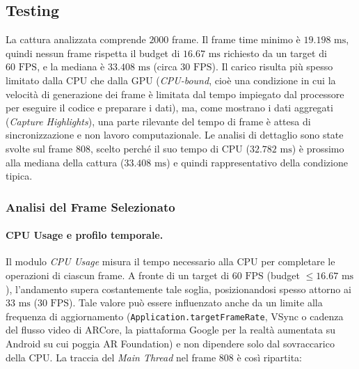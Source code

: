 \subsection{Testing}
La cattura analizzata comprende $2000$ frame. Il frame time minimo è $19.198\text{ ms}$, quindi nessun frame rispetta il budget di $16.67\text{ ms}$ richiesto da un target di $60\text{ FPS}$, e la mediana è $33.408\text{ ms}$ (circa $30\text{ FPS}$). Il carico risulta più spesso limitato dalla CPU che dalla GPU (\textit{CPU-bound}, cioè una condizione in cui la velocità di generazione dei frame è limitata dal tempo impiegato dal processore per eseguire il codice e preparare i dati), ma, come mostrano i dati aggregati (\textit{Capture Highlights}), una parte rilevante del tempo di frame è attesa di sincronizzazione e non lavoro computazionale. Le analisi di dettaglio sono state svolte sul frame $808$, scelto perché il suo tempo di CPU ($32.782\text{ ms}$) è prossimo alla mediana della cattura ($33.408\text{ ms}$) e quindi rappresentativo della condizione tipica.

\subsubsection{Analisi del Frame Selezionato}

\paragraph{CPU Usage e profilo temporale.} Il modulo \textit{CPU Usage} misura il tempo necessario alla CPU per completare le operazioni di ciascun frame. A fronte di un target di $60\text{ FPS}$ (budget $\le 16.67\text{ ms}$), l'andamento supera costantemente tale soglia, posizionandosi spesso attorno ai $33\text{ ms}$ ($30\text{ FPS}$). Tale valore può essere influenzato anche da un limite alla frequenza di aggiornamento (\texttt{Application.\allowbreak targetFrameRate}, VSync o cadenza del flusso video di ARCore, la piattaforma Google per la realtà aumentata su Android su cui poggia AR Foundation) e non dipendere solo dal sovraccarico della CPU. La traccia del \textit{Main Thread} nel frame $808$ è così ripartita:

